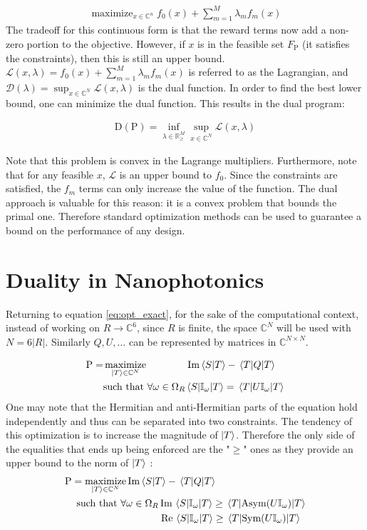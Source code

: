 \documentclass[twocolumn]{revtex4-2}
\DeclareMathOperator*{\maximize}{maximize}
\begin{document}
\begin{align}
	\maximize_{x\in\mathbb{C}^n} f_0(x) + \sum_{m=1}^M \lambda_mf_m(x)
\end{align}
The tradeoff for this continuous form is that the reward terms now add a non-zero portion to the objective. However, if $x$ is in the feasible set $F_\text{P}$ (it satisfies the constraints), then this is still an upper bound. $\mathcal{L}(x, \lambda) = f_0(x) + \sum_{m=1}^M \lambda_mf_m(x)$ is referred to as the Lagrangian, and $\mathcal{D}(\lambda) = \sup_{x\in\mathbb{C}^N}\mathcal{L}(x, \lambda)$ is the dual function. In order to find the best lower bound, one can minimize the dual function. This results in the dual program:

\begin{align}
\text{D}(\text{P}) = \inf_{\lambda\in\mathbb{R}^M_{\ge}}\sup_{x\in\mathbb{C}^N}\mathcal{L}(x, \lambda)
\end{align}

Note that this problem is convex in the Lagrange multipliers. Furthermore, note that for any feasible $x$, $\mathcal{L}$ is an upper bound to $f_0$. Since the constraints are satisfied, the $f_m$ terms can only increase the value of the function. The dual approach is valuable for this reason: it is a convex problem that bounds the primal one. Therefore standard optimization methods can be used to guarantee a bound on the performance of any design.

\section{Duality in Nanophotonics}
\label{sec:duality_in_nanophotonics}
Returning to equation \ref{eq:opt_exact}, for the sake of the computational context, instead of working on $R\rightarrow\mathbb{C}^6$, since $R$ is finite, the space $\mathbb{C}^N$ will be used with $N=6|R|$. Similarly $Q, U, \dots$ can be represented by matrices in $\mathbb{C}^{N\times N}$. 

\begin{align}
	\label{eq:opt_discrete}
	\text{P}=&\maximize_{\ket{T}\in \mathbb{C}^N}\qquad\qquad \Im\braket{S}{T} - \ev{Q}{T}\\
	&\text{such that } \forall \omega\in\Omega_R \mel{S}{\mathbb{I}_\omega}{T} = \ev{U\mathbb{I}_\omega}{T}\nonumber
\end{align}
One may note that the Hermitian and anti-Hermitian parts of the equation  hold independently and thus can be separated into two constraints.  The tendency of this optimization is to increase the magnitude of $\ket{T}$. Therefore the only side of the equalities that ends up being enforced are the "$\ge$" ones as they provide an upper bound to the norm of $\ket{T}$ :
\begin{align}
	\label{eq:opt_ineq}
	\text{P}=\maximize_{\ket{T}\in \mathbb{C}^N} &\Im\braket{S}{T} - \ev{Q}{T}\\
	\text{such that } \forall &\omega\in\Omega_R \Im\mel{S}{\mathbb{I}_\omega}{T} \ge \ev{\text{Asym}\qty(U\mathbb{I}_\omega)}{T}\nonumber\\
	&\qquad\quad\ \Re\mel{S}{\mathbb{I}_\omega}{T} \ge \ev{\text{Sym}\qty(U\mathbb{I}_\omega)}{T}\nonumber
\end{align}
\end{document}
